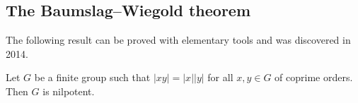 

\subsection{The Baumslag--Wiegold theorem}

The following result can be proved with elementary tools 
and was discovered 
in 2014. 

\begin{theorem}
Let $G$ be a finite group such that $|xy|=|x||y|$ for all $x,y\in G$ of coprime orders. 
Then $G$ is nilpotent. 
\end{theorem}

